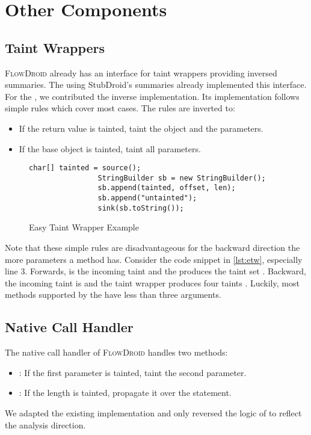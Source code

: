 \documentclass[../draft.tex]{subfiles}
\begin{document}
    \section{Other Components}
    \subsection{Taint Wrappers}\label{s:taintwrapper}
    \textsc{FlowDroid} already has an interface  for taint wrappers providing inversed summaries. The  using StubDroid's summaries already implemented this interface. For the , we contributed the inverse implementation. Its implementation follows simple rules which cover most cases\cite{Arzt2017PhD}. The rules are inverted to:
    \begin{itemize}
        \item If the return value is tainted, taint the object and the parameters.
        \item If the base object is tainted, taint all parameters.
    \end{itemize}

    \begin{figure}[ht]
        \centering
        \begin{adjustbox}{max width=\columnwidth}
            \begin{lstlisting}[gobble=16]
                char[] tainted = source();
                StringBuilder sb = new StringBuilder();
                sb.append(tainted, offset, len);
                sb.append("untainted");
                sink(sb.toString());
            \end{lstlisting}
        \end{adjustbox}
        \caption{Easy Taint Wrapper Example}
        \label{lst:etw}
    \end{figure}

    Note that these simple rules are disadvantageous for the backward direction the more parameters a method has. Consider the code snippet in \autoref{lst:etw}, especially line 3. Forwards, 
     is the incoming taint and the  produces the taint set . Backward, the incoming taint is  and the taint wrapper produces four taints . Luckily, most methods supported by the  have less than three arguments.

    \subsection{Native Call Handler}
    The native call handler of \textsc{FlowDroid} handles two methods:
    \begin{itemize}
        \item {}: If the first parameter is tainted, taint the second parameter.
        \item {}: If the length is tainted, propagate it over the statement.
    \end{itemize}
    We adapted the existing implementation and only reversed the logic of  to reflect the analysis direction.
\end{document}
